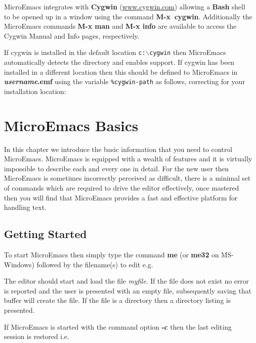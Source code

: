 \documentclass[11pt,a4paper,pdftex]{article}
\begin{document}
  MicroEmacs integrates with \textbf{Cygwin}
  (\href{http://www.cygwin.com}{www.cygwin.com}) allowing a \textbf{Bash}
  shell to be opened up in a window using the command \textbf{M-x\ cygwin}.
  Additionally the MicroEmacs commands \textbf{M-x man} and \textbf{M-x
  info} are available to access the Cygwin Manual and Info pages,
  respectively.

  If cygwin is installed in the default location \texttt{c:$\backslash$cygwin}
  then MicroEmacs automatically detects the directory and enables support. If
  cygwin has been installed in a different location then this should be
  defined to MicroEmacs in \textbf{\textit{username}.emf} using the variable
  \texttt{\%cygwin-path} as follows, correcting for your installation
  location:


\cleardoublepage
\section{MicroEmacs Basics}

  In this chapter we introduce the basic information that you need to control
  MicroEmacs. MicroEmacs is equipped with a wealth of features and it is
  virtually impossible to describe each and every one in detail. For the new
  user then MicroEmacs is sometimes incorrectly perceived as difficult, there
  is a minimal set of commands which are required to drive the editor
  effectively, once mastered then you will find that MicroEmacs provides a
  fast and effective platform for handling text.

\subsection{Getting Started}

  To start MicroEmacs then simply type the command \textbf{me} (or
  \textbf{me32} on MS-Windows) followed by the filename(s) to edit e.g.


  The editor should start and load the file \textit{myfile}. If the file does
  not exist no error is reported and the user is presented with an empty file,
  subsequently saving that buffer will create the file. If the file is a
  directory then a directory listing is presented.

  If MicroEmacs is started with the command option \textbf{-c} then the last
  editing session is restored i.e.
\end{document}
